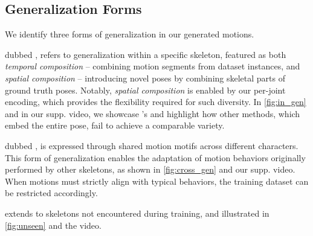 \ifarxiv

\fi
\subsection{Generalization Forms}



We identify three forms of generalization in our generated motions.

\myparagraph{\Ingen} dubbed \ingen, refers to generalization within a specific skeleton, featured as both \emph{temporal composition} -- combining motion segments from dataset instances, and \emph{spatial composition} -- introducing novel poses by combining skeletal parts of ground truth poses. Notably, \emph{spatial composition} is enabled by our per-joint encoding, which provides the flexibility required for such diversity. In \cref{fig:in_gen} and in our supp. video, we showcase \algoname's \ingen and highlight how other methods, which embed the entire pose, fail to achieve a comparable variety.

\myparagraph{\Crossgen} dubbed \crossgen, 
is expressed through shared motion motifs across different characters. This form of generalization enables the adaptation of motion behaviors originally performed by other skeletons, as shown in \cref{fig:cross_gen} and our supp. video. 
When motions must strictly align with typical behaviors, the training dataset can be restricted accordingly.

\myparagraph{\Unseengen} 
extends to skeletons not encountered during training, and illustrated in \cref{fig:unseen} and the video.

